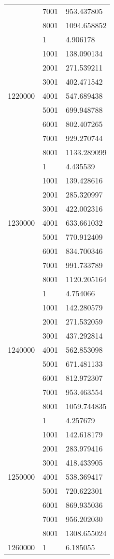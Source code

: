 \begin{table}[htb!]
\begin{tabular}{lll}
 & 7001 & 953.437805 \\
 & 8001 & 1094.658852 \\
\multirow[c]{9}{*}{1220000} & 1 & 4.906178 \\
 & 1001 & 138.090134 \\
 & 2001 & 271.539211 \\
 & 3001 & 402.471542 \\
 & 4001 & 547.689438 \\
 & 5001 & 699.948788 \\
 & 6001 & 802.407265 \\
 & 7001 & 929.270744 \\
 & 8001 & 1133.289099 \\
\multirow[c]{9}{*}{1230000} & 1 & 4.435539 \\
 & 1001 & 139.428616 \\
 & 2001 & 285.320997 \\
 & 3001 & 422.002316 \\
 & 4001 & 633.661032 \\
 & 5001 & 770.912409 \\
 & 6001 & 834.700346 \\
 & 7001 & 991.733789 \\
 & 8001 & 1120.205164 \\
\multirow[c]{9}{*}{1240000} & 1 & 4.754066 \\
 & 1001 & 142.280579 \\
 & 2001 & 271.532059 \\
 & 3001 & 437.292814 \\
 & 4001 & 562.853098 \\
 & 5001 & 671.481133 \\
 & 6001 & 812.972307 \\
 & 7001 & 953.463554 \\
 & 8001 & 1059.744835 \\
\multirow[c]{9}{*}{1250000} & 1 & 4.257679 \\
 & 1001 & 142.618179 \\
 & 2001 & 283.979416 \\
 & 3001 & 418.433905 \\
 & 4001 & 538.369417 \\
 & 5001 & 720.622301 \\
 & 6001 & 869.935036 \\
 & 7001 & 956.202030 \\
 & 8001 & 1308.655024 \\
\multirow[c]{9}{*}{1260000} & 1 & 6.185055 \\

\end{tabular}
\end{table}
